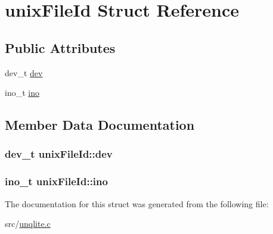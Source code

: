 \hypertarget{structunix_file_id}{\section{unix\-File\-Id Struct Reference}
\label{d2/d56/structunix_file_id}
}
\subsection*{Public Attributes}
\begin{DoxyCompactItemize}
\item 
dev\-\_\-t \hyperlink{structunix_file_id_acf703d95b9a1ae2f34affb7e9ae45e1b}{dev}
\item 
ino\-\_\-t \hyperlink{structunix_file_id_a2cc2d43e9d3f0a60810daa8fc353e692}{ino}
\end{DoxyCompactItemize}


\subsection{Member Data Documentation}
\hypertarget{structunix_file_id_acf703d95b9a1ae2f34affb7e9ae45e1b}{
\subsubsection[{dev}]{\setlength{\rightskip}{0pt plus 5cm}dev\-\_\-t unix\-File\-Id\-::dev}}\label{d2/d56/structunix_file_id_acf703d95b9a1ae2f34affb7e9ae45e1b}
\hypertarget{structunix_file_id_a2cc2d43e9d3f0a60810daa8fc353e692}{
\subsubsection[{ino}]{\setlength{\rightskip}{0pt plus 5cm}ino\-\_\-t unix\-File\-Id\-::ino}}\label{d2/d56/structunix_file_id_a2cc2d43e9d3f0a60810daa8fc353e692}


The documentation for this struct was generated from the following file\-:\begin{DoxyCompactItemize}
\item 
src/\hyperlink{unqlite_8c}{unqlite.\-c}\end{DoxyCompactItemize}
